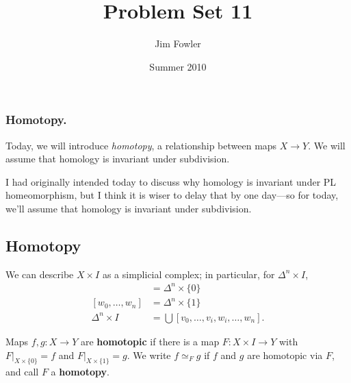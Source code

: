 \documentclass[12pt]{pset}
\title{Problem Set 11}
\author{Jim Fowler}
\date{Summer 2010}
\begin{document}
\maketitle


\subsubsection*{Homotopy.} Today, 
we will introduce
\textit{homotopy}, a relationship between maps $X \to Y$.
We will assume that homology is invariant under subdivision.


\baselineskip
\parindent 0pt

I had originally intended today to discuss why homology is invariant
under PL homeomorphism, but I think it is wiser to delay that by one
day---so for today, we'll assume that homology is invariant under subdivision.


\subsection*{Homotopy}

\begin{definition*}
  We can describe $X \times I$ as a simplicial complex; in particular, for
  $\Delta^n \times I$,
  \begin{align*}
    [v_0,\ldots,v_n] &= \Delta^n \times \{0\} \\
    [w_0,\ldots,w_n] &= \Delta^n \times \{1\} \\
    \Delta^n \times I &= \bigcup [v_0,\ldots,v_i,w_i,\ldots,w_n].
    \end{align*}

  Maps $f, g : X \to Y$ are \textbf{homotopic} if there is a map $F :
  X \times I \to Y$ with $F |_{X \times \{0\}} = f$ and $F |_{X \times
    \{1\}} = g$.  We write $f \simeq_F g$ if $f$ and $g$ are homotopic
  via $F$, and call $F$ a \textbf{homotopy}.
\end{definition*}
\end{document}

